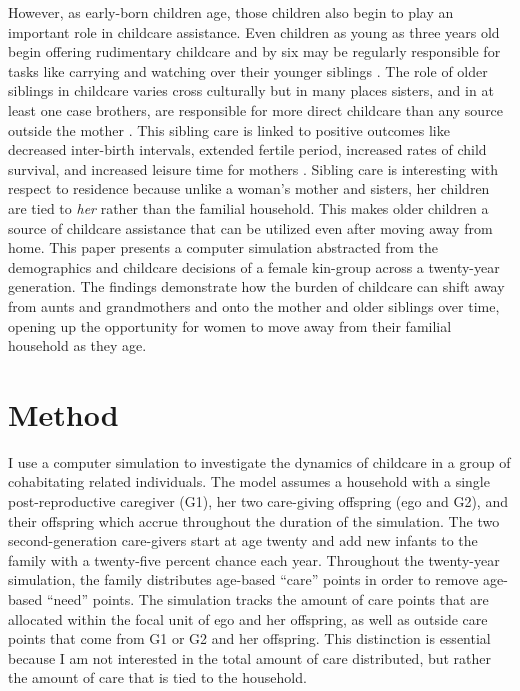 However, as early-born children age, those children also begin to play an important role in childcare assistance.  Even children as young as three years old begin offering rudimentary childcare and by six may be regularly responsible for tasks like carrying and watching over their younger siblings \cite{zeller1987role, kramer2004reconsidering, hames1988allocation, denham1974infant, dunbar2002helping}.  The role of older siblings in childcare varies cross culturally but in many places sisters, and in at least one case brothers, are responsible for more direct childcare than any source outside the mother \cite{kramer2005children}.  This sibling care is linked to positive outcomes like decreased inter-birth intervals, extended fertile period, increased rates of child survival, and increased leisure time for mothers \cite{turke1988helpers, Bereczei2002helping, crognier2001helpers, bove2002girl}.  Sibling care is interesting with respect to residence because unlike a woman's mother and sisters, her children are tied to \textit{her} rather than the familial household.  This makes older children a source of childcare assistance that can be utilized even after moving away from home.  This paper presents a computer simulation abstracted from the demographics and childcare decisions of a female kin-group across a twenty-year generation.  The findings demonstrate how the burden of childcare can shift away from aunts and grandmothers and onto the mother and older siblings over time, opening up the opportunity for women to move away from their familial household as they age.

\section{Method}
\label{sec:1}
I use a computer simulation to investigate the dynamics of childcare in a group of cohabitating related individuals.  The model assumes a household with a single post-reproductive caregiver (G1), her two care-giving offspring (ego and G2), and their offspring which accrue throughout the duration of the simulation.  The two second-generation care-givers start at age twenty and add new infants to the family with a twenty-five percent chance each year.  Throughout the twenty-year simulation, the family distributes age-based “care” points in order to remove age-based “need” points.  The simulation tracks the amount of care points that are allocated within the focal unit of ego and her offspring, as well as outside care points that come from G1 or G2 and her offspring.  This distinction is essential because I am not interested in the total amount of care distributed, but rather the amount of care that is tied to the household.  

